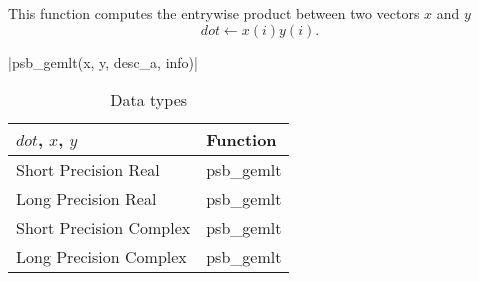 This function computes the entrywise product between two vectors $x$ and
$y$
\[dot \leftarrow x(i) y(i).\]

\fortinline|psb_gemlt(x, y, desc_a, info)|

\begin{table}[h]
	\begin{center}
		\begin{tabular}{ll}
			\hline
			$dot$, $x$, $y$ & {\bf Function}\\
			\hline
			Short Precision Real & psb\_gemlt \\
			Long Precision Real & psb\_gemlt \\
			Short Precision Complex & psb\_gemlt \\
			Long Precision Complex & psb\_gemlt \\
			\hline
		\end{tabular}
	\end{center}
	\caption{Data types\label{tab:f90mlt}}
\end{table}

